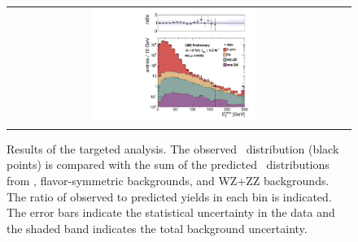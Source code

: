 \begin{figure}[!h]
\begin{center}
\begin{tabular}{cc}
\includegraphics[width=0.5\textwidth]{plots/pfmet_bvetoMedium_all.pdf}
\end{tabular}
\caption{Results of the targeted analysis. The observed \MET\ distribution (black points) is compared with the sum of the predicted \MET\
distributions from \zjets, flavor-symmetric backgrounds, and WZ+ZZ backgrounds. The ratio of observed to predicted yields in each bin is
indicated. The error bars indicate the statistical uncertainty in the data and the shaded band indicates the total background uncertainty.
\label{fig:results_targ}
}
\end{center}
\end{figure}



